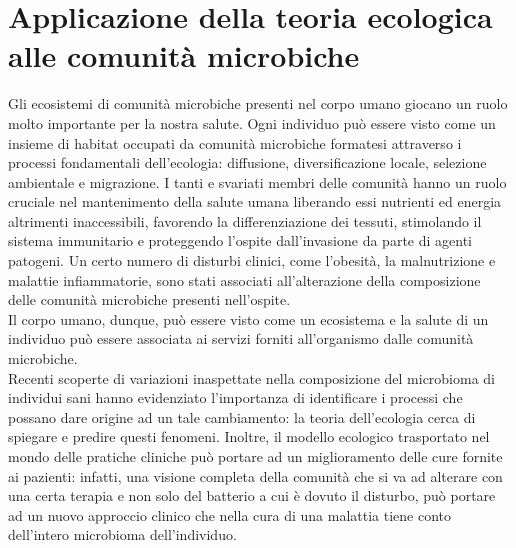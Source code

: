 \chapter{Applicazione della teoria ecologica alle comunità microbiche}

Gli ecosistemi di comunità microbiche presenti nel corpo umano giocano un ruolo molto importante per la nostra salute\cite{Costello1255}. Ogni individuo può essere visto come un insieme di habitat occupati da comunità microbiche formatesi attraverso i processi fondamentali dell'ecologia: diffusione, diversificazione locale, selezione ambientale e migrazione. I tanti e svariati membri delle comunità hanno un ruolo cruciale nel mantenimento della salute umana liberando essi nutrienti ed energia altrimenti inaccessibili, favorendo la differenziazione dei tessuti, stimolando il sistema immunitario e proteggendo l'ospite dall'invasione da parte di agenti patogeni. 
Un certo numero di disturbi clinici, come l'obesità, la malnutrizione e malattie infiammatorie, sono stati associati all'alterazione della composizione delle comunità microbiche presenti nell'ospite.\\
Il corpo umano, dunque, può essere visto come un ecosistema e la salute di un individuo può essere associata ai servizi forniti
all'organismo dalle comunità microbiche.\\
Recenti scoperte di variazioni inaspettate nella composizione del microbioma di individui sani hanno evidenziato l'importanza di identificare i processi che possano dare origine ad un tale cambiamento: la teoria dell'ecologia cerca di spiegare e predire questi fenomeni. Inoltre, il modello ecologico trasportato nel mondo delle pratiche cliniche può portare ad un miglioramento delle cure fornite ai pazienti: infatti, una visione completa della comunità che si va ad alterare con una certa terapia e non solo del batterio a cui è dovuto il disturbo, può portare ad un nuovo approccio clinico che nella cura di una malattia tiene conto dell'intero microbioma dell'individuo.

